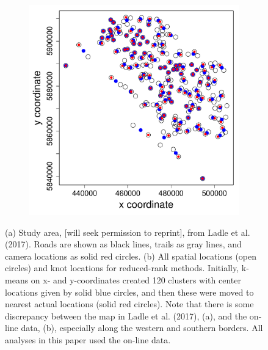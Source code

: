 \documentclass[11pt, titlepage]{article}\usepackage[]{graphicx}\usepackage[]{color}
\begin{document}
\begin{spacing}{1.9}
\begin{flushleft}
\begin{singlespace}
\begin{figure}
\begin{subfigure}[b]{0.5\textwidth}
	    \includegraphics[width=\linewidth]{figure/Fig-knotLocs-1.pdf}
      \caption{}
      \end{subfigure}
	  \caption{(a) Study area, [will seek permission to reprint], from Ladle et al. (2017). Roads are shown as black lines, trails as gray lines, and camera locations as solid red circles. (b) All spatial locations (open circles) and knot locations for reduced-rank methods.  Initially, k-means on x- and y-coordinates created 120 clusters with center locations given by solid blue circles, and then these were moved to nearest actual locations (solid red circles).  Note that there is some discrepancy between the map in Ladle et al. (2017), (a), and the on-line data, (b), especially along the western and southern borders.  All analyses in this paper used the on-line data.}\label{fig:reduRank}
  \end{figure}




\end{singlespace}
\end{flushleft}
\end{spacing}
\end{document}
